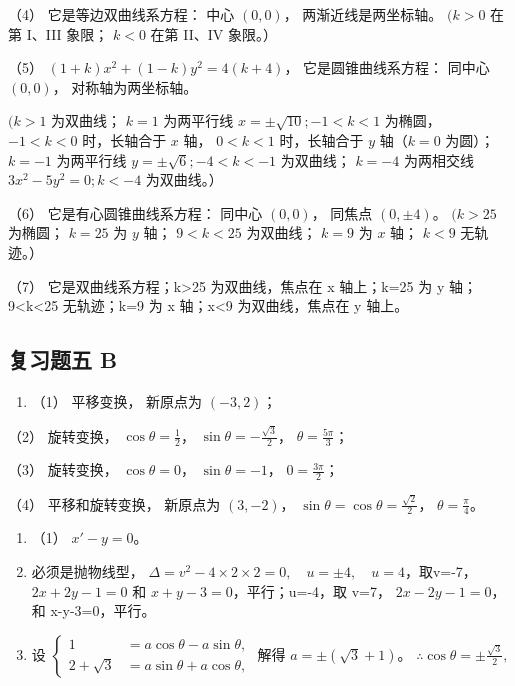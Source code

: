 （4） 它是等边双曲线系方程： 中心 \((0,0)\)， 两渐近线是两坐标轴。
\((k > 0\) 在第 I、III 象限； \(k < 0\) 在第 II、IV 象限。）

（5） \((1 + k)x^{2} + (1 - k)y^{2} = 4(k + 4)\)， 它是圆锥曲线系方程：
同中心 \((0, 0)\)， 对称轴为两坐标轴。

\((k > 1\) 为双曲线； \(k = 1\) 为两平行线
\(x = \pm \sqrt{10}; -1 < k < 1\) 为椭圆， \(-1 < k < 0\) 时，长轴合于
\(x\) 轴， \(0 < k < 1\) 时，长轴合于 \(y\) 轴（\(k = 0\)
为圆）；\(k = -1\) 为两平行线 \(y = \pm \sqrt{6}; -4 < k < -1\)
为双曲线； \(k = -4\) 为两相交线 \(3x^{2} - 5y^{2} = 0; k < -4\)
为双曲线。）

（6） 它是有心圆锥曲线系方程： 同中心 \((0,0)\)， 同焦点 \((0,\pm 4)\)。
\((k > 25\) 为椭圆； \(k = 25\) 为 \(y\) 轴； \(9 < k < 25\) 为双曲线；
\(k = 9\) 为 \(x\) 轴； \(k < 9\) 无轨迹。）

（7） 它是双曲线系方程；k\textgreater25 为双曲线，焦点在 x 轴上；k=25 为
y 轴；9\textless k\textless25 无轨迹；k=9 为 x 轴；x\textless9
为双曲线，焦点在 y 轴上。

\subsection{复习题五 B}\label{ux590dux4e60ux9898ux4e94-b-1}

\begin{enumerate}
\def\labelenumi{\arabic{enumi}.}
\tightlist
\item
  （1） 平移变换， 新原点为 \((-3, 2)\)；
\end{enumerate}

（2） 旋转变换， \(\cos\theta=\frac{1}{2}\)，
\(\sin\theta=-\frac{\sqrt{3}}{2}\)， \(\theta=\frac{5\pi}{3}\)；

（3） 旋转变换， \(\cos\theta=0\)， \(\sin\theta=-1\)，
\(0=\frac{3\pi}{2}\)；

（4） 平移和旋转变换， 新原点为 \((3, -2)\)，
\(\sin \theta = \cos \theta = \frac{\sqrt{2}}{2}\)，
\(\theta = \frac{\pi}{4}\)。

\begin{enumerate}
\def\labelenumi{\arabic{enumi}.}
\setcounter{enumi}{1}
\item
  （1） \(x' - y = 0\)。
\item
  必须是抛物线型，
  \(\Delta=v^{2}-4\times2\times2=0,\quad u=\pm4,\quad u=4\)，取v=-7，
  \(2x+2y-1=0\) 和 \(x+y-3=0\)，平行；u=-4，取 v=7， \(2x-2y-1=0\)，和
  x-y-3=0，平行。
\item
  设
  \(\left\{\begin{aligned}1&=a\cos\theta-a\sin\theta,\\ 2+\sqrt{3}&=a\sin\theta+a\cos\theta,\end{aligned}\right.\)
  解得 \(a=\pm(\sqrt{3}+1)\)。
  \(\therefore\cos\theta=\pm\frac{\sqrt{3}}{2},\)
\end{enumerate}

